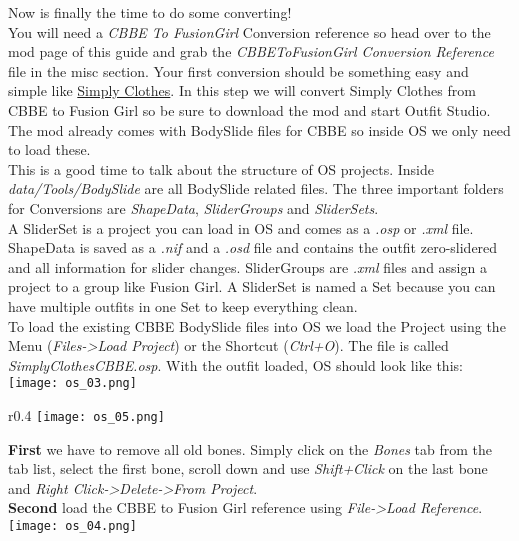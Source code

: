 Now is finally the time to do some converting!\\
You will need a \textit{CBBE To FusionGirl} Conversion reference so head over to the mod page of this guide and grab the 
\textit{CBBEToFusionGirl Conversion Reference} file in the misc section.
Your first conversion should be something easy and simple like \href{https://www.nexusmods.com/fallout4/mods/6935}{Simply Clothes}.
In this step we will convert Simply Clothes from CBBE to Fusion Girl so be sure to download the mod and start Outfit Studio.\\
The mod already comes with BodySlide files for CBBE so inside OS we only need to load these.\\
This is a good time to talk about the structure of OS projects. Inside \textit{data/Tools/BodySlide} are all BodySlide related files.
The three important folders for Conversions are \textit{ShapeData}, \textit{SliderGroups} and \textit{SliderSets}.\\
A SliderSet is a project you can load in OS and comes as a \textit{.osp} or \textit{.xml} file. ShapeData is saved as a \textit{.nif} 
and a \textit{.osd} file and contains the outfit zero-slidered and all information for slider changes. SliderGroups are \textit{.xml} files 
and assign a project to a group like Fusion Girl. A SliderSet is named a Set because you can have multiple outfits in one Set to keep 
everything clean.\\
To load the existing CBBE BodySlide files into OS we load the Project using the Menu (\textit{Files->Load Project}) or the Shortcut (\textit{Ctrl+O}).
The file is called \textit{SimplyClothesCBBE.osp}. With the outfit loaded, OS should look like this:\\
\texttt{[image: os\_03.png]}\\
\begin{wrapfigure}[5]{r}{0.4\textwidth}
    \vspace{-20pt}
    \texttt{[image: os\_05.png]}
\end{wrapfigure}
\textbf{First} we have to remove all old bones. Simply click on the \textit{Bones} tab from the tab list, select the first bone, 
scroll down and use \textit{Shift+Click} on the last bone and \textit{Right Click->Delete->From Project}.\\
\textbf{Second} load the CBBE to Fusion Girl reference using \textit{File->Load Reference}.\\
\texttt{[image: os\_04.png]}\\
